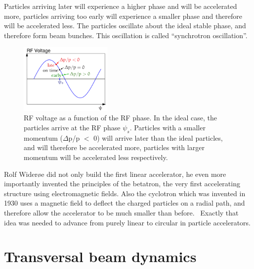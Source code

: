 Particles arriving later will experience a higher phase and will be accelerated more, particles arriving too early will experience a smaller phase and therefore will be accelerated less.
The particles oscillate about the ideal stable phase, and therefore form beam bunches.
This oscillation is called ``synchrotron oscillation''.
\begin{figure}
\centering
\includegraphics[width=0.4\textwidth]{Figures/RFphase.png}
\caption[Phase focusing]{RF voltage as a function of the RF phase. In the ideal case, the particles arrive at the RF phase $\psi_s$. 
Particles with a smaller momentum ($\Delta$p/p $<$ 0) will arrive later than the ideal particles, and will therefore be accelerated more, particles with larger momentum will be accelerated less respectively.}
\label{fig:RFPhase}
\end{figure}

Rolf Wider\o e did not only build the first linear accelerator, he even more importantly invented the principles of the betatron, the very first accelerating structure using electromagnetic fields.
Also the cyclotron which was invented in 1930 uses a magnetic field to deflect the charged particles on a radial path, and therefore allow the accelerator to be much smaller than before.~\cite[cf. p. 8]{Wilson}
Exactly that idea was needed to advance from purely linear to circular in particle accelerators.

\section{Transversal beam dynamics}
\label{AccPhysics:Magnets}

